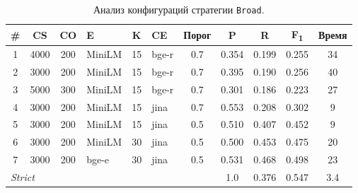 \begin{table}[H]
    \caption{Анализ конфигураций стратегии \texttt{Broad}.}
    \label{tab:broad_rest}
    \centering
    \begin{tabular}{ccclclccccc}
        \hline
        \textbf{\#}                         & \textbf{CS} & \textbf{CO} & \textbf{E} & \textbf{K} & \textbf{CE} & \textbf{Порог} & \textbf{P} & \textbf{R} & \textbf{F\textsubscript{1}} & \textbf{Время} \\
        \hline
        1                                   & 4000        & 200         & MiniLM     & 15         & bge-r       & 0.7            & 0.354      & 0.199      & 0.255                       & 34             \\
        2                                   & 3000        & 200         & MiniLM     & 15         & bge-r       & 0.7            & 0.395      & 0.190      & 0.256                       & 40             \\
        3                                   & 5000        & 300         & MiniLM     & 15         & bge-r       & 0.7            & 0.301      & 0.186      & 0.223                       & 27             \\
        4                                   & 3000        & 200         & MiniLM     & 15         & jina        & 0.7            & 0.553      & 0.208      & 0.302                       & 9              \\
        5                                   & 3000        & 200         & MiniLM     & 15         & jina        & 0.5            & 0.510      & 0.407      & 0.452                       & 9              \\
        6                                   & 3000        & 200         & MiniLM     & 30         & jina        & 0.5            & 0.500      & 0.453      & 0.475                       & 20             \\
        7                                   & 3000        & 200         & bge-e      & 30         & jina        & 0.5            & 0.531      & 0.468      & 0.498                       & 23             \\
        \hline
        \multicolumn{4}{l}{\textit{Strict}} &             &             &            & 1.0        & 0.376       & 0.547          & 3.4                                                                    \\
        \hline
    \end{tabular}


\end{table}
